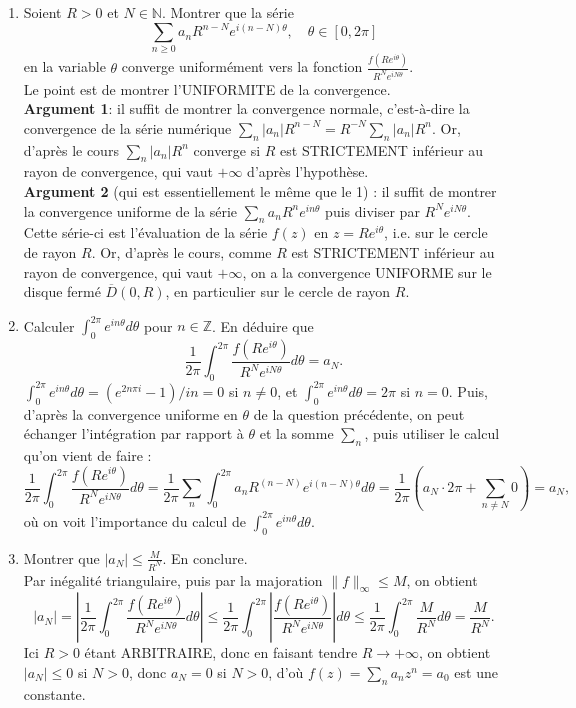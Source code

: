 \documentclass[a4paper,10pt]{article}
\newcommand{\N}{\mathbb{N}}
\newcommand{\Z}{\mathbb{Z}}
\newcommand{\C}{\mathbb{C}}
\newcommand{\norm}[1]{\|#1\|}
\newcommand{\abs}[1]{\left|#1\right|}
\newcommand{\correction}[1]{{\color{red}#1}}
\newcommand{\comment}[1]{{\color{blue}#1}}
\begin{document}
\begin{enumerate}[label=\alph*)]
    \item Soient $R>0$ et $N\in\N$. Montrer que la série
    $$\sum_{n\geq0}a_nR^{n-N}e^{i(n-N)\theta},\quad \theta\in[0,2\pi]$$
    en la variable $\theta$ converge uniformément vers la fonction $\frac{f(Re^{i\theta})}{R^Ne^{iN\theta}}$.\\
    \correction{Le point est de montrer l'UNIFORMITE de la convergence.\\
    \textbf{Argument 1}: il suffit de montrer la convergence normale, c'est-à-dire la convergence de la série numérique $\sum_n \abs{a_n}R^{n-N}=R^{-N}\sum_n\abs{a_n}R^n$. Or, d'après le cours $\sum_n\abs{a_n}R^n$ converge si $R$ est STRICTEMENT inférieur au rayon de convergence, qui vaut $+\infty$ d'après l'hypothèse.}\\
    \comment{\textbf{Argument 2} (qui est essentiellement le même que le 1) : il suffit de montrer la convergence uniforme de la série $\sum_na_nR^ne^{in\theta}$ puis diviser par $R^Ne^{iN\theta}$. Cette série-ci est l'évaluation de la série $f(z)$ en $z=Re^{i\theta}$, i.e. sur le cercle de rayon $R$. Or, d'après le cours, comme $R$ est STRICTEMENT inférieur au rayon de convergence, qui vaut $+\infty$, on a la convergence UNIFORME sur le disque fermé $\overline{D}(0,R)$, en particulier sur le cercle de rayon $R$.}
    \item Calculer $\int_0^{2\pi}e^{in\theta}d\theta$ pour $n\in\Z$. En déduire que 
    $$\frac{1}{2\pi}\int_0^{2\pi}\frac{f(Re^{i\theta})}{R^Ne^{iN\theta}}d\theta=a_N.$$
    \correction{$\int_0^{2\pi}e^{in\theta}d\theta=(e^{2n\pi i}-1)/in=0$ si $n\neq 0$, et $\int_0^{2\pi}e^{in\theta}d\theta=2\pi$ si $n=0$.
    Puis, d'après la convergence uniforme en $\theta$ de la question précédente, on peut échanger l'intégration par rapport à $\theta$ et la somme $\sum_n$, puis utiliser le calcul qu'on vient de faire :
    $$\frac{1}{2\pi}\int_0^{2\pi}\frac{f(Re^{i\theta})}{R^Ne^{iN\theta}}d\theta=\frac{1}{2\pi}\sum_n\int_0^{2\pi}a_nR^{(n-N)}e^{i(n-N)\theta}d\theta=\frac{1}{2\pi}(a_N\cdot2\pi+\sum_{n\neq N}0)=a_N,$$
    où on voit l'importance du calcul de $\int_0^{2\pi}e^{in\theta}d\theta$.}
    \item Montrer que $\abs{a_N}\leq\frac{M}{R^N}$. En conclure.\\
    \correction{Par inégalité triangulaire, puis par la majoration $\norm{f}_\infty\leq M$, on obtient
    $$\abs{a_N}=\abs{\frac{1}{2\pi}\int_0^{2\pi}\frac{f(Re^{i\theta})}{R^Ne^{iN\theta}}d\theta}\leq
    \frac{1}{2\pi}\int_0^{2\pi}\abs{\frac{f(Re^{i\theta})}{R^Ne^{iN\theta}}}d\theta\leq
    \frac{1}{2\pi}\int_0^{2\pi}\frac{M}{R^N}d\theta=\frac{M}{R^N}.$$
    Ici $R>0$ étant ARBITRAIRE, donc en faisant tendre $R\to+\infty$, on obtient $\abs{a_N}\leq 0$ si $N>0$, donc $a_N=0$ si $N>0$, d'où $f(z)=\sum_n a_nz^n=a_0$ est une constante.}
\end{enumerate}  
\end{document}
